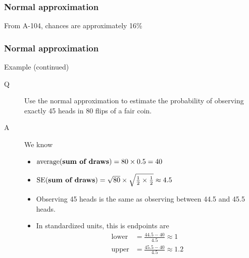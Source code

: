 \documentclass[handout]{beamer}
\begin{document}


   \begin{frame}
   \frametitle{Normal approximation}
   \begin{center}
   \end{center}
   From A-104, chances are approximately 16\%
   \end{frame}


   \begin{frame} \frametitle{Normal approximation}

   \begin{block}
   {Example (continued)}
   \begin{description}
   \item[Q] Use the normal approximation to estimate the
     probability of observing exactly 45 heads in 80 flips of a fair coin.
   \item[A] We know
     \begin{itemize}
     \item $\text{average({\bf sum of draws})} = 80 \times 0.5 = 40 $
     \item $\text{SE({\bf sum of draws})} = \sqrt{80} \times \sqrt{\frac{1}{2} \times  \frac{1}{2}} \approx 4.5 $
     \item Observing 45 heads is the same as observing between 44.5 and 45.5 heads.
       \item In standardized units, this is endpoints are
       $$
       \begin{aligned}
       \text{lower}&= \frac{44.5-40}{4.5}    \approx 1 \\
       \text{upper}&= \frac{45.5-40}{4.5}    \approx 1.2 \\
       \end{aligned}
       $$
     \end{itemize}
   \end{description}
   \end{block}
   \end{frame}
\end{document}
